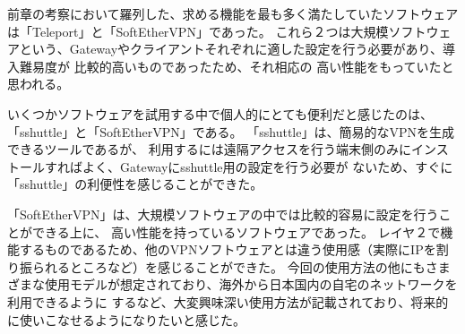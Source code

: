 \documentclass[11pt,a4j,titlepage]{jreport}
\begin{document}
前章の考察において羅列した、求める機能を最も多く満たしていたソフトウェアは「Teleport」と「SoftEtherVPN」であった。
これら２つは大規模ソフトウェアという、Gatewayやクライアントそれぞれに適した設定を行う必要があり、導入難易度が
比較的高いものであったため、それ相応の
高い性能をもっていたと思われる。\par
いくつかソフトウェアを試用する中で個人的にとても便利だと感じたのは、「sshuttle」と「SoftEtherVPN」である。
「sshuttle」は、簡易的なVPNを生成できるツールであるが、
利用するには遠隔アクセスを行う端末側のみにインストールすればよく、Gatewayにsshuttle用の設定を行う必要が
ないため、すぐに「sshuttle」の利便性を感じることができた。\par
「SoftEtherVPN」は、大規模ソフトウェアの中では比較的容易に設定を行うことができる上に、
高い性能を持っているソフトウェアであった。
レイヤ２で機能するものであるため、他のVPNソフトウェアとは違う使用感（実際にIPを割り振られるところなど）を感じることができた。
今回の使用方法の他にもさまざまな使用モデルが想定されており、海外から日本国内の自宅のネットワークを利用できるように
するなど、大変興味深い使用方法が記載されており、将来的に使いこなせるようになりたいと感じた。


















\end{document}

